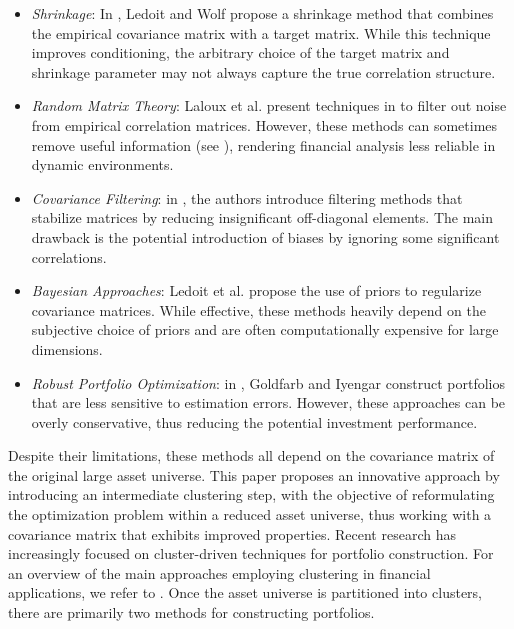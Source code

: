 \documentclass[sigconf]{acmart}
\begin{document}
\begin{itemize}
    \item \textit{Shrinkage}: In \cite{LedoitWolfShrinkage}, Ledoit and Wolf propose a shrinkage method that combines the empirical covariance matrix with a target matrix. While this technique improves conditioning, the arbitrary choice of the target matrix and shrinkage parameter may not always capture the true correlation structure.
    \item \textit{Random Matrix Theory}: Laloux et al. present techniques in \cite{laloux} to filter out noise from empirical correlation matrices. However, these methods can sometimes remove useful information (see \cite{community_detection_random_matrix_theory}), rendering financial analysis less reliable in dynamic environments.
    
    \item \textit{Covariance Filtering}: in \cite{BickelLevina2008}, the authors introduce filtering methods that stabilize matrices by reducing insignificant off-diagonal elements. The main drawback is the potential introduction of biases by ignoring some significant correlations.
    \item \textit{Bayesian Approaches}: Ledoit et al. \cite{Ledoit2003} propose the use of priors to regularize covariance matrices. While effective, these methods heavily depend on the subjective choice of priors and are often computationally expensive for large dimensions.
    \item \textit{Robust Portfolio Optimization}: in \cite{GoldfarbIyengar2003}, Goldfarb and Iyengar construct portfolios that are less sensitive to estimation errors. However, these approaches can be overly conservative, thus reducing the potential investment performance.
\end{itemize}

Despite their limitations, these methods all depend on the covariance matrix of the original large asset universe. This paper proposes an innovative approach by introducing an intermediate clustering step, with the objective of reformulating the optimization problem within a reduced asset universe, thus working with a covariance matrix that exhibits improved properties. Recent research has increasingly focused on cluster-driven techniques for portfolio construction. For an overview of the main approaches employing clustering in financial applications, we refer to \cite{StatisticalArbitrage}. Once the asset universe is partitioned into clusters, there are primarily two methods for constructing portfolios.
\end{document}
